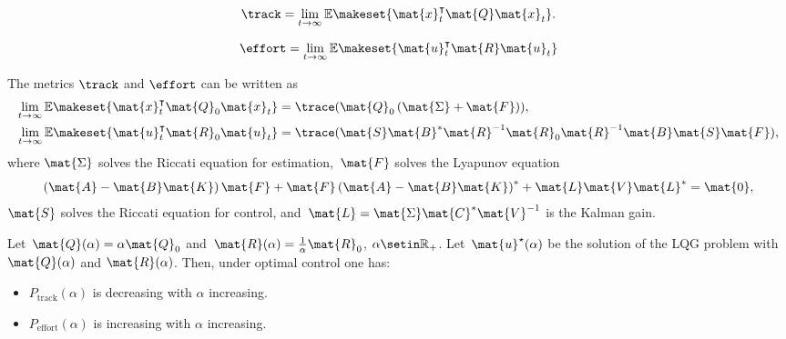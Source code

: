 {\begin{forslides}
        \begin{equation}
            \label{eq:ptrack}
            \track=\lim_{t\to \infty}\mathbb{E}\makeset{\mat{x}_t^\intercal \mat{Q}\mat{x}_t}.
        \end{equation}

        \begin{equation}
            \label{eq:peffort}
            \effort=\lim_{t\to \infty}\mathbb{E}\makeset{\mat{u}_t^\intercal \mat{R} \mat{u}_t }
        \end{equation}

        \begin{lemma}
            \label{lem:precision}
            The metrics $\track$ and $\effort$ can be written as
            \begin{equation}
                \begin{aligned}
                    \lim_{t\to \infty}\mathbb{E}\makeset{ \mat{x}_t^\intercal \mat{Q}_0\mat{x}_t} & =\trace(\mat{Q}_0\left( \mat{\Sigma} +\mat{F}\right)), \\
                    \lim_{t\to \infty}\mathbb{E}\makeset{ \mat{u}_t^\intercal \mat{R}_0\mat{u}_t} & =\trace(\mat{S}\mat{B}^*\mat{R}^{-1}\mat{R}_0\mat{R}^{-1}\mat{B}\mat{S}\mat{F}),
                \end{aligned}
            \end{equation}
            where
            $\mat{\Sigma}$ solves the Riccati equation for estimation,~$\mat{F}$ solves the Lyapunov equation
            \begin{equation}
                \label{eq:lyapct}
                \left( \mat{A}-\mat{B}\mat{K}\right)\mat{F}+\mat{F}\left(\mat{A}-\mat{B}\mat{K}\right)^*+\mat{L}\mat{V}\mat{L}^*=\mat{0},
            \end{equation}
            $\mat{S}$ solves the Riccati equation for control, and~$\mat{L}=\mat{\Sigma}\mat{C}^*\mat{V}^{-1}$ is the Kalman gain.
        \end{lemma}

        \begin{lemma}
            \label{lem:codesigncnt_1}
            Let~$\mat{Q}(\alpha)=\alpha \mat{Q}_0$ and~$\mat{R}(\alpha)=\frac{1}{\alpha}\mat{R}_0$, $\alpha\setin \mathbb{R}_+$.
            Let~$\mat{u}^\star(\alpha)$ be the solution of the LQG problem with $\mat{Q}(\alpha)$ and $\mat{R}(\alpha)$.
            Then, under optimal control one has:
            \begin{itemize}
                \item $P_\mathrm{track}(\alpha)$ is decreasing with $\alpha$
                      increasing.
                \item $P_\mathrm{effort}(\alpha)$ is increasing with $\alpha$ increasing.
            \end{itemize}
        \end{lemma}


\end{forslides}}
